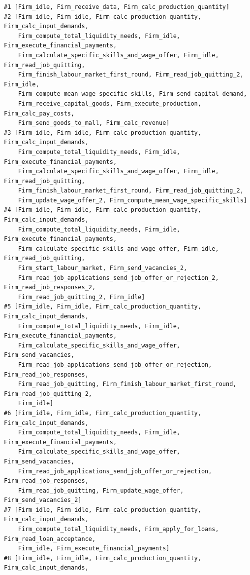 {\small
\begin{verbatim}
#1 [Firm_idle, Firm_receive_data, Firm_calc_production_quantity]
#2 [Firm_idle, Firm_idle, Firm_calc_production_quantity, Firm_calc_input_demands, 
    Firm_compute_total_liquidity_needs, Firm_idle, Firm_execute_financial_payments, 
    Firm_calculate_specific_skills_and_wage_offer, Firm_idle, Firm_read_job_quitting,
    Firm_finish_labour_market_first_round, Firm_read_job_quitting_2, Firm_idle,
    Firm_compute_mean_wage_specific_skills, Firm_send_capital_demand,
    Firm_receive_capital_goods, Firm_execute_production, Firm_calc_pay_costs,
    Firm_send_goods_to_mall, Firm_calc_revenue]
#3 [Firm_idle, Firm_idle, Firm_calc_production_quantity, Firm_calc_input_demands,
    Firm_compute_total_liquidity_needs, Firm_idle, Firm_execute_financial_payments,
    Firm_calculate_specific_skills_and_wage_offer, Firm_idle, Firm_read_job_quitting,
    Firm_finish_labour_market_first_round, Firm_read_job_quitting_2,
    Firm_update_wage_offer_2, Firm_compute_mean_wage_specific_skills]
#4 [Firm_idle, Firm_idle, Firm_calc_production_quantity, Firm_calc_input_demands,
    Firm_compute_total_liquidity_needs, Firm_idle, Firm_execute_financial_payments,
    Firm_calculate_specific_skills_and_wage_offer, Firm_idle, Firm_read_job_quitting,
    Firm_start_labour_market, Firm_send_vacancies_2,
    Firm_read_job_applications_send_job_offer_or_rejection_2, Firm_read_job_responses_2,
    Firm_read_job_quitting_2, Firm_idle]
#5 [Firm_idle, Firm_idle, Firm_calc_production_quantity, Firm_calc_input_demands,
    Firm_compute_total_liquidity_needs, Firm_idle, Firm_execute_financial_payments,
    Firm_calculate_specific_skills_and_wage_offer, Firm_send_vacancies,
    Firm_read_job_applications_send_job_offer_or_rejection, Firm_read_job_responses,
    Firm_read_job_quitting, Firm_finish_labour_market_first_round, Firm_read_job_quitting_2,
    Firm_idle]
#6 [Firm_idle, Firm_idle, Firm_calc_production_quantity, Firm_calc_input_demands,
    Firm_compute_total_liquidity_needs, Firm_idle, Firm_execute_financial_payments,
    Firm_calculate_specific_skills_and_wage_offer, Firm_send_vacancies,
    Firm_read_job_applications_send_job_offer_or_rejection, Firm_read_job_responses,
    Firm_read_job_quitting, Firm_update_wage_offer, Firm_send_vacancies_2]
#7 [Firm_idle, Firm_idle, Firm_calc_production_quantity, Firm_calc_input_demands,
    Firm_compute_total_liquidity_needs, Firm_apply_for_loans, Firm_read_loan_acceptance,
    Firm_idle, Firm_execute_financial_payments]
#8 [Firm_idle, Firm_idle, Firm_calc_production_quantity, Firm_calc_input_demands,

\end{verbatim}}
